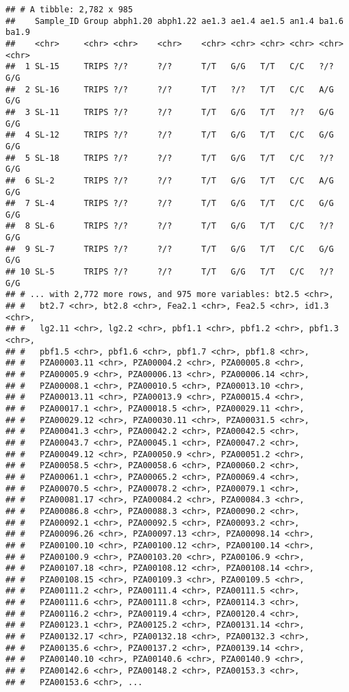\documentclass[]{article}
\begin{document}
\begin{verbatim}
## # A tibble: 2,782 x 985
##    Sample_ID Group abph1.20 abph1.22 ae1.3 ae1.4 ae1.5 an1.4 ba1.6 ba1.9
##    <chr>     <chr> <chr>    <chr>    <chr> <chr> <chr> <chr> <chr> <chr>
##  1 SL-15     TRIPS ?/?      ?/?      T/T   G/G   T/T   C/C   ?/?   G/G  
##  2 SL-16     TRIPS ?/?      ?/?      T/T   ?/?   T/T   C/C   A/G   G/G  
##  3 SL-11     TRIPS ?/?      ?/?      T/T   G/G   T/T   ?/?   G/G   G/G  
##  4 SL-12     TRIPS ?/?      ?/?      T/T   G/G   T/T   C/C   G/G   G/G  
##  5 SL-18     TRIPS ?/?      ?/?      T/T   G/G   T/T   C/C   ?/?   G/G  
##  6 SL-2      TRIPS ?/?      ?/?      T/T   G/G   T/T   C/C   A/G   G/G  
##  7 SL-4      TRIPS ?/?      ?/?      T/T   G/G   T/T   C/C   G/G   G/G  
##  8 SL-6      TRIPS ?/?      ?/?      T/T   G/G   T/T   C/C   ?/?   G/G  
##  9 SL-7      TRIPS ?/?      ?/?      T/T   G/G   T/T   C/C   G/G   G/G  
## 10 SL-5      TRIPS ?/?      ?/?      T/T   G/G   T/T   C/C   ?/?   G/G  
## # ... with 2,772 more rows, and 975 more variables: bt2.5 <chr>,
## #   bt2.7 <chr>, bt2.8 <chr>, Fea2.1 <chr>, Fea2.5 <chr>, id1.3 <chr>,
## #   lg2.11 <chr>, lg2.2 <chr>, pbf1.1 <chr>, pbf1.2 <chr>, pbf1.3 <chr>,
## #   pbf1.5 <chr>, pbf1.6 <chr>, pbf1.7 <chr>, pbf1.8 <chr>,
## #   PZA00003.11 <chr>, PZA00004.2 <chr>, PZA00005.8 <chr>,
## #   PZA00005.9 <chr>, PZA00006.13 <chr>, PZA00006.14 <chr>,
## #   PZA00008.1 <chr>, PZA00010.5 <chr>, PZA00013.10 <chr>,
## #   PZA00013.11 <chr>, PZA00013.9 <chr>, PZA00015.4 <chr>,
## #   PZA00017.1 <chr>, PZA00018.5 <chr>, PZA00029.11 <chr>,
## #   PZA00029.12 <chr>, PZA00030.11 <chr>, PZA00031.5 <chr>,
## #   PZA00041.3 <chr>, PZA00042.2 <chr>, PZA00042.5 <chr>,
## #   PZA00043.7 <chr>, PZA00045.1 <chr>, PZA00047.2 <chr>,
## #   PZA00049.12 <chr>, PZA00050.9 <chr>, PZA00051.2 <chr>,
## #   PZA00058.5 <chr>, PZA00058.6 <chr>, PZA00060.2 <chr>,
## #   PZA00061.1 <chr>, PZA00065.2 <chr>, PZA00069.4 <chr>,
## #   PZA00070.5 <chr>, PZA00078.2 <chr>, PZA00079.1 <chr>,
## #   PZA00081.17 <chr>, PZA00084.2 <chr>, PZA00084.3 <chr>,
## #   PZA00086.8 <chr>, PZA00088.3 <chr>, PZA00090.2 <chr>,
## #   PZA00092.1 <chr>, PZA00092.5 <chr>, PZA00093.2 <chr>,
## #   PZA00096.26 <chr>, PZA00097.13 <chr>, PZA00098.14 <chr>,
## #   PZA00100.10 <chr>, PZA00100.12 <chr>, PZA00100.14 <chr>,
## #   PZA00100.9 <chr>, PZA00103.20 <chr>, PZA00106.9 <chr>,
## #   PZA00107.18 <chr>, PZA00108.12 <chr>, PZA00108.14 <chr>,
## #   PZA00108.15 <chr>, PZA00109.3 <chr>, PZA00109.5 <chr>,
## #   PZA00111.2 <chr>, PZA00111.4 <chr>, PZA00111.5 <chr>,
## #   PZA00111.6 <chr>, PZA00111.8 <chr>, PZA00114.3 <chr>,
## #   PZA00116.2 <chr>, PZA00119.4 <chr>, PZA00120.4 <chr>,
## #   PZA00123.1 <chr>, PZA00125.2 <chr>, PZA00131.14 <chr>,
## #   PZA00132.17 <chr>, PZA00132.18 <chr>, PZA00132.3 <chr>,
## #   PZA00135.6 <chr>, PZA00137.2 <chr>, PZA00139.14 <chr>,
## #   PZA00140.10 <chr>, PZA00140.6 <chr>, PZA00140.9 <chr>,
## #   PZA00142.6 <chr>, PZA00148.2 <chr>, PZA00153.3 <chr>,
## #   PZA00153.6 <chr>, ...
\end{verbatim}
\end{document}
